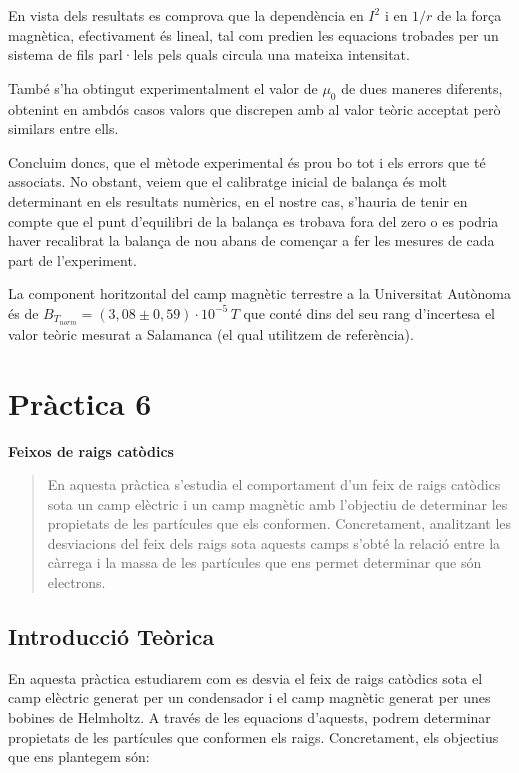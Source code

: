 \documentclass[11pt]{article}
\numberwithin{equation}{section}
\numberwithin{figure}{section}
\numberwithin{table}{section}
\begin{document}
En vista dels resultats es comprova que la dependència en $I^2$ i en $1/r$ de la força magnètica, efectivament és lineal, tal com predien les equacions trobades per un sistema de fils parl·lels pels quals circula una mateixa intensitat. 

També s’ha obtingut experimentalment el valor de $\mu_0$ de dues maneres diferents, obtenint en ambdós casos valors que discrepen amb al valor teòric acceptat però similars entre ells.

Concluim doncs, que el mètode experimental és prou bo tot i els errors que té associats. No obstant, veiem que el calibratge inicial de balança és molt determinant en els resultats numèrics, en el nostre cas, s'hauria de tenir en compte que el punt d'equilibri de la balança es trobava fora del zero o es podria haver recalibrat la balança de nou abans de començar a fer les mesures de cada part de l'experiment.

La component horitzontal del camp magnètic terrestre a la Universitat Autònoma és de $B_{T_{norm}}= (3,08 \pm 0,59)\cdot10^{-5} \, T$ que conté dins del seu rang d’incertesa el valor teòric mesurat a Salamanca (el qual utilitzem de referència).

\newpage

\section{\huge \textbf{Pràctica 6}}  %

\vspace{.5em}  %

{\Huge \textbf{Feixos de raigs catòdics}}  %

\begin{abstract}
     En aquesta pràctica s'estudia el comportament d'un feix de raigs catòdics sota un camp elèctric i un camp magnètic amb l'objectiu de determinar les propietats de les partícules que els conformen. Concretament, analitzant les desviacions del feix dels raigs sota aquests camps s'obté la relació entre la càrrega i la massa de les partícules que ens permet determinar que són electrons.
\end{abstract}

\subsection{Introducció Teòrica}
En aquesta pràctica estudiarem com es desvia el feix de raigs catòdics sota el camp elèctric generat per un condensador i el camp magnètic generat per unes bobines de Helmholtz. A través de les equacions d'aquests, podrem determinar propietats de les partícules que conformen els raigs. Concretament, els objectius que ens plantegem són:
\end{document}
